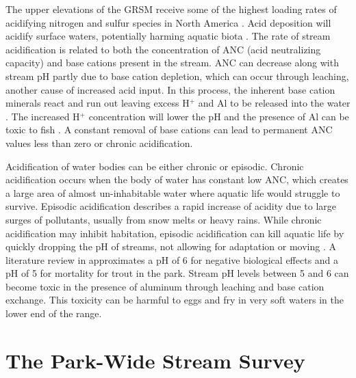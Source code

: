The upper elevations of the GRSM receive some of the highest loading rates of acidifying nitrogen and sulfur species in North America \citep{johnson1992atmospheric, weathers2006}.  
Acid deposition will acidify surface waters, potentially harming aquatic biota \citep{neff2009physiological}.
The rate of stream acidification is related to both the concentration of ANC (acid neutralizing capacity) and base cations present in the stream.
ANC can decrease along with stream pH partly due to base cation depletion, which can occur through leaching, another cause of increased acid input.
In this process, the inherent base cation minerals react and run out leaving excess H$^+$ and Al to be released into the water \citep{sullivan2004}.
The increased H$^+$ concentration will lower the pH and the presence of Al can be toxic to fish \citep{driscoll2003effects}.
A constant removal of base cations can lead to permanent ANC values less than zero or chronic acidification.

Acidification of water bodies can be either chronic or episodic. 
Chronic acidification occurs when the body of water has constant low ANC, which creates a large area of  almost un-inhabitable water where aquatic life would struggle to survive. 
Episodic acidification describes a rapid increase of acidity due to large surges of pollutants, usually from snow melts or heavy rains.  
While chronic acidification may inhibit habitation, episodic acidification can kill aquatic life by quickly dropping the pH of streams, not allowing for adaptation or moving \citep{sullivan2004}.
A literature review in \citet{neff2009physiological} approximates a pH of 6 for negative biological effects and a pH of 5 for mortality for trout in the park.  
Stream pH levels between 5 and 6 can become toxic in the presence of aluminum through leaching and base cation exchange.
This toxicity can be harmful to eggs and fry in very soft waters in the lower end of the range.  


\section{The Park-Wide Stream Survey} 


